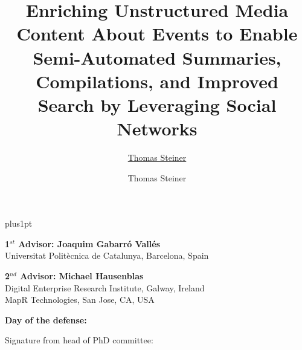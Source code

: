 \documentclass[twoside,11pt]{Latex/Classes/PhDthesisPSnPDF}
\title{Enriching Unstructured Media Content About Events to Enable Semi-Automated Summaries, Compilations, and Improved Search by Leveraging Social Networks}
\author{\href{mailto:tsteiner@lsi.upc.edu}{Thomas Steiner}}
\author{Thomas Steiner}
\begin{document}

\renewcommand\baselinestretch{1.2}
\baselineskip=18pt plus1pt



\maketitle  %



\newpage
\vspace{10mm}
\textbf{1$^{st}$ Advisor: Joaquim Gabarró Vallés}\\
\indent Universitat Politècnica de Catalunya, Barcelona, Spain

\vspace{10mm}
\textbf{2$^{nd}$ Advisor: Michael Hausenblas}\\
\indent Digital Enterprise Research Institute, Galway, Ireland\\
\indent MapR Technologies, San Jose, CA, USA

\vspace{20mm}
\textbf{Day of the defense:} 

\vspace{20mm}
\hspace{70mm}Signature from head of PhD committee:





%   


\end{document}

